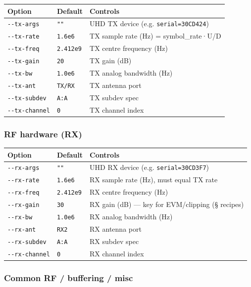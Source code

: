 \documentclass[
  10pt,
]{article}
\begin{document}
\begin{longtable}[]{@{}lll@{}}
\toprule
Option & Default & Controls \\
\midrule
\endhead
\texttt{-\/-tx-args} & \texttt{""} & UHD TX device (e.g.
\texttt{serial=30CD424}) \\
\texttt{-\/-tx-rate} & \texttt{1.6e6} & TX sample rate (Hz) =
symbol\_rate·U/D \\
\texttt{-\/-tx-freq} & \texttt{2.412e9} & TX centre frequency (Hz) \\
\texttt{-\/-tx-gain} & \texttt{20} & TX gain (dB) \\
\texttt{-\/-tx-bw} & \texttt{1.0e6} & TX analog bandwidth (Hz) \\
\texttt{-\/-tx-ant} & \texttt{TX/RX} & TX antenna port \\
\texttt{-\/-tx-subdev} & \texttt{A:A} & TX subdev spec \\
\texttt{-\/-tx-channel} & \texttt{0} & TX channel index \\
\bottomrule
\end{longtable}

\hypertarget{rf-hardware-rx}{%
\subsubsection{RF hardware (RX)}\label{rf-hardware-rx}}

\begin{longtable}[]{@{}lll@{}}
\toprule
Option & Default & Controls \\
\midrule
\endhead
\texttt{-\/-rx-args} & \texttt{""} & UHD RX device (e.g.
\texttt{serial=30CD3F7}) \\
\texttt{-\/-rx-rate} & \texttt{1.6e6} & RX sample rate (Hz), must equal
TX rate \\
\texttt{-\/-rx-freq} & \texttt{2.412e9} & RX centre frequency (Hz) \\
\texttt{-\/-rx-gain} & \texttt{30} & RX gain (dB) --- key for
EVM/clipping (§ recipes) \\
\texttt{-\/-rx-bw} & \texttt{1.0e6} & RX analog bandwidth (Hz) \\
\texttt{-\/-rx-ant} & \texttt{RX2} & RX antenna port \\
\texttt{-\/-rx-subdev} & \texttt{A:A} & RX subdev spec \\
\texttt{-\/-rx-channel} & \texttt{0} & RX channel index \\
\bottomrule
\end{longtable}

\hypertarget{common-rf--buffering--misc}{%
\subsubsection{Common RF / buffering /
misc}\label{common-rf--buffering--misc}}
\end{document}
